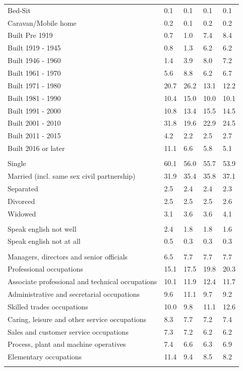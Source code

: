 \documentclass{article}
\begin{document}
\begin{table}[h]
\begin{tabular}{KTTTT}
Bed-Sit & 0.1& 0.1& 0.1& 0.1\\
Caravan/Mobile home & 0.2& 0.1& 0.2& 0.2\\
    \hline
Built Pre 1919 & 0.7& 1.0& 7.4& 8.4\\
Built 1919 - 1945 & 0.8& 1.3& 6.2& 6.2\\
Built  1946 - 1960 & 1.4& 3.9& 8.0& 7.2\\
Built  1961 - 1970 & 5.6& 8.8& 6.2& 6.7\\
Built  1971 - 1980 & 20.7& 26.2& 13.1& 12.2\\
Built  1981 - 1990 & 10.4& 15.0& 10.0& 10.1\\
Built  1991 - 2000 & 10.8& 13.4& 15.5& 14.5\\
Built  2001 - 2010 & 31.8& 19.6& 22.9& 24.5\\
Built  2011 - 2015 & 4.2& 2.2& 2.5& 2.7\\
Built  2016 or later & 11.1&  6.6&  5.8&  5.1\\
\hline
    \\
    \hline
Single & 60.1& 56.0& 55.7& 53.9\\
Married (incl. same sex civil partnership) & 31.9& 35.4& 35.8& 37.1\\
Separated  & 2.5& 2.4& 2.4& 2.3\\
Divorced  & 2.5& 2.5& 2.5& 2.6\\
Widowed & 3.1& 3.6& 3.6& 4.1\\
\hline
    \\ 
    \hline
Speak english not well & 2.4& 1.8& 1.8& 1.6\\
Speak english not at all & 0.5& 0.3& 0.3& 0.3\\
\hline
    \\
    \hline
Managers, directors and senior officials & 6.5& 7.7& 7.7& 7.7\\
Professional occupations & 15.1& 17.5& 19.8& 20.3\\
Associate professional and technical occupations & 10.1& 11.9& 12.4& 11.7\\
Administrative and secretarial occupations &  9.6& 11.1&  9.7&  9.2\\
Skilled trades occupations & 10.0&  9.8& 11.1& 12.6\\
Caring, leisure and other service occupations & 8.3& 7.7& 7.2& 7.4\\
Sales and customer service occupations & 7.3& 7.2& 6.2& 6.2\\
Process, plant and machine operatives & 7.4& 6.6& 6.3& 6.9\\
Elementary occupations & 11.4&  9.4&  8.5&  8.2\\
\hline
\end{tabular}
\end{table}
\end{document}
